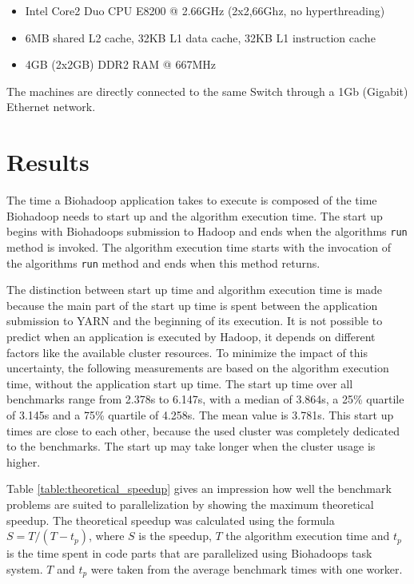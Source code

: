 \begin{itemize}
  \item Intel Core2 Duo CPU E8200 @ 2.66GHz (2x2,66Ghz, no hyperthreading)
  \item 6MB shared L2 cache, 32KB L1 data cache, 32KB L1 instruction cache
  \item 4GB (2x2GB) DDR2 RAM @ 667MHz
\end{itemize}

The machines are directly connected to the same Switch through a 1Gb (Gigabit) Ethernet network.

\section{Results}
\label{chap:evaluation:result}
The time a Biohadoop application takes to execute is composed of the time Biohadoop needs to start up and the algorithm execution time. The start up begins with Biohadoops submission to Hadoop and ends when the algorithms \texttt{run} method is invoked. The algorithm execution time starts with the invocation of the algorithms \texttt{run} method and ends when this method returns.

The distinction between start up time and algorithm execution time is made because the main part of the start up time is spent between the application submission to YARN and the beginning of its execution. It is not possible to predict when an application is executed by Hadoop, it depends on different factors like the available cluster resources. To minimize the impact of this uncertainty, the following measurements are based on the algorithm execution time, without the application start up time. The start up time over all benchmarks range from 2.378s to 6.147s, with a median of 3.864s, a 25\% quartile of 3.145s and a 75\% quartile of 4.258s. The mean value is 3.781s. This start up times are close to each other, because the used cluster was completely dedicated to the benchmarks. The start up may take longer when the cluster usage is higher.

Table \ref{table:theoretical_speedup} gives an impression how well the benchmark problems are suited to parallelization by showing the maximum theoretical speedup. The theoretical speedup was calculated using the formula $S = T / (T - t_p)$, where $S$ is the speedup, $T$ the algorithm execution time and $t_p$ is the time spent in code parts that are parallelized using Biohadoops task system. $T$ and $t_p$ were taken from the average benchmark times with one worker.

